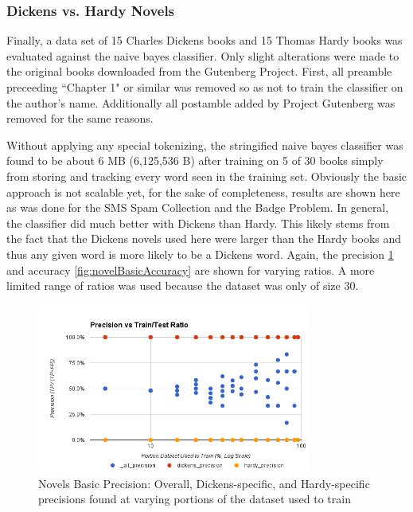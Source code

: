 \subsubsection{Dickens vs. Hardy Novels}
\label{subsection:novelsBasic}
Finally, a data set of 15 Charles Dickens books \cite{gutenberg:dickens} and 15 Thomas Hardy books \cite{gutenberg:hardy}
was evaluated against the naive bayes classifier. Only slight alterations were made to the original books downloaded
from the Gutenberg Project. First, all preamble preceeding ``Chapter 1" or similar was removed so as not to train the
classifier on the author's name. Additionally all postamble added by Project Gutenberg was removed for the same reasons.

Without applying any special tokenizing, the stringified naive bayes classifier was found to be about 6 MB (6,125,536 B)
after training on 5 of 30 books simply from storing and tracking every word seen in the training set. Obviously the
basic approach is not scalable yet, for the sake of completeness, results are shown here as was done for the SMS Spam
Collection and the Badge Problem. In general, the classifier did much better with Dickens than Hardy. This likely
stems from the fact that the Dickens novels used here were larger than the Hardy books and thus any given word is more
likely to be a Dickens word. Again, the precision \ref{fig:novelBasicPrecision} and accuracy \ref{fig:novelBasicAccuracy}
are shown for varying ratios. A more limited range of ratios was used because the dataset was only of size 30.

\begin{figure}[ht!]
    \centering
    \includegraphics[width=90mm]{img/novels_basic-precision.png}
    \caption{Novels Basic Precision: Overall, Dickens-specific, and Hardy-specific precisions found at varying portions of the dataset used to train}
    \label{fig:novelBasicPrecision}
\end{figure}

